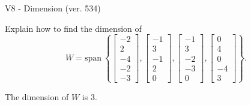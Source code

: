 \begin{exercise}
  \begin{exerciseTitle}V8 - Dimension (ver. 534)\end{exerciseTitle}
  \begin{exerciseStatement}
    Explain how to find the dimension of 
\[W=\mathrm{span}\ \left\{\left[\begin{array}{r}
-2 \\
2 \\
-4 \\
-2 \\
-3
\end{array}\right] , \left[\begin{array}{r}
-1 \\
3 \\
-1 \\
2 \\
0
\end{array}\right] , \left[\begin{array}{r}
-1 \\
3 \\
-2 \\
-3 \\
0
\end{array}\right] , \left[\begin{array}{r}
0 \\
4 \\
0 \\
-4 \\
3
\end{array}\right]\right\}.\]



  \end{exerciseStatement}
  \begin{exerciseAnswer}
   The dimension of \(W\) is  \(3\).
  


  \end{exerciseAnswer}
\end{exercise}